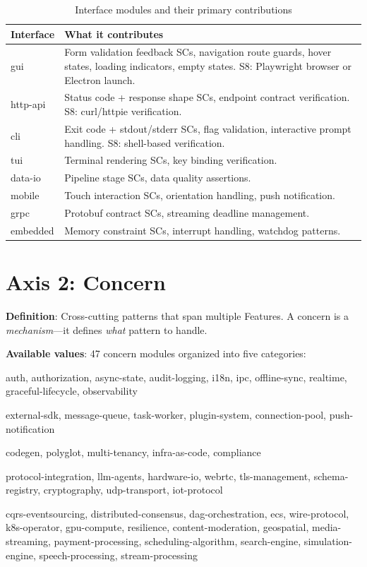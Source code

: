 \documentclass[11pt,a4paper,openright,twoside]{report}
\begin{document}
\begin{table}[H]
\centering
\caption{Interface modules and their primary contributions}
\label{tab:interfaces}
\begin{tabularx}{\textwidth}{lX}
\toprule
\textbf{Interface} & \textbf{What it contributes} \\
\midrule
gui & Form validation feedback SCs, navigation route guards, hover states, loading indicators, empty states. S8: Playwright browser or Electron launch. \\
http-api & Status code + response shape SCs, endpoint contract verification. S8: curl/httpie verification. \\
cli & Exit code + stdout/stderr SCs, flag validation, interactive prompt handling. S8: shell-based verification. \\
tui & Terminal rendering SCs, key binding verification. \\
data-io & Pipeline stage SCs, data quality assertions. \\
mobile & Touch interaction SCs, orientation handling, push notification. \\
grpc & Protobuf contract SCs, streaming deadline management. \\
embedded & Memory constraint SCs, interrupt handling, watchdog patterns. \\
\bottomrule
\end{tabularx}
\end{table}

\section{Axis 2: Concern}

\textbf{Definition}: Cross-cutting patterns that span multiple Features. A concern is a \emph{mechanism}---it defines \emph{what} pattern to handle.

\textbf{Available values}: 47 concern modules organized into five categories:

\begin{description}[style=nextline]
  \item[Core] auth, authorization, async-state, audit-logging, i18n, ipc, offline-sync, realtime, graceful-lifecycle, observability
  \item[Integration] external-sdk, message-queue, task-worker, plugin-system, connection-pool, push-notification
  \item[Code] codegen, polyglot, multi-tenancy, infra-as-code, compliance
  \item[Protocol] protocol-integration, llm-agents, hardware-io, webrtc, tls-management, schema-registry, cryptography, udp-transport, iot-protocol
  \item[Domain] cqrs-eventsourcing, distributed-consensus, dag-orchestration, ecs, wire-protocol, k8s-operator, gpu-compute, resilience, content-moderation, geospatial, media-streaming, payment-processing, scheduling-algorithm, search-engine, simulation-engine, speech-processing, stream-processing
\end{description}
\end{document}
